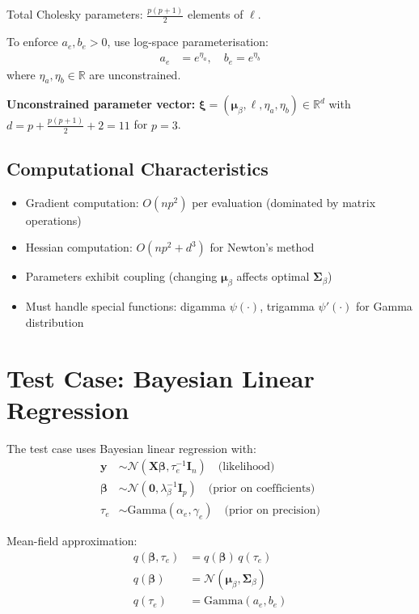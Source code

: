 \documentclass[11pt]{article}
\newcommand{\R}{\mathbb{R}}
\newcommand{\N}{\mathcal{N}}
\begin{document}
Total Cholesky parameters: $\frac{p(p+1)}{2}$ elements of $\bm{\ell}$.

To enforce $a_e, b_e > 0$, use log-space parameterisation:
\begin{align}
a_e &= e^{\eta_a}, \quad b_e = e^{\eta_b}
\end{align}
where $\eta_a, \eta_b \in \R$ are unconstrained.

\textbf{Unconstrained parameter vector:} $\bm{\xi} = (\bm{\mu}_\beta, \bm{\ell}, \eta_a, \eta_b) \in \R^d$ with $d = p + \frac{p(p+1)}{2} + 2 = 11$ for $p=3$.

\subsection*{Computational Characteristics}

\begin{itemize}
\item Gradient computation: $O(np^2)$ per evaluation (dominated by matrix operations)
\item Hessian computation: $O(np^2 + d^3)$ for Newton's method
\item Parameters exhibit coupling (changing $\bm{\mu}_\beta$ affects optimal $\bm{\Sigma}_\beta$)
\item Must handle special functions: digamma $\psi(\cdot)$, trigamma $\psi'(\cdot)$ for Gamma distribution
\end{itemize}
\newpage
\section*{Test Case: Bayesian Linear Regression}

The test case uses Bayesian linear regression with:
\begin{align}
\bm{y} &\sim \N(\bm{X}\bm{\beta}, \tau_e^{-1} \bm{I}_n) \quad \text{(likelihood)}\\
\bm{\beta} &\sim \N(\bm{0}, \lambda_\beta^{-1} \bm{I}_p) \quad \text{(prior on coefficients)}\\
\tau_e &\sim \text{Gamma}(\alpha_e, \gamma_e) \quad \text{(prior on precision)}
\end{align}

Mean-field approximation:
\begin{align}
q(\bm{\beta}, \tau_e) &= q(\bm{\beta}) \, q(\tau_e)\\
q(\bm{\beta}) &= \N(\bm{\mu}_\beta, \bm{\Sigma}_\beta)\\
q(\tau_e) &= \text{Gamma}(a_e, b_e)
\end{align}
\end{document}
